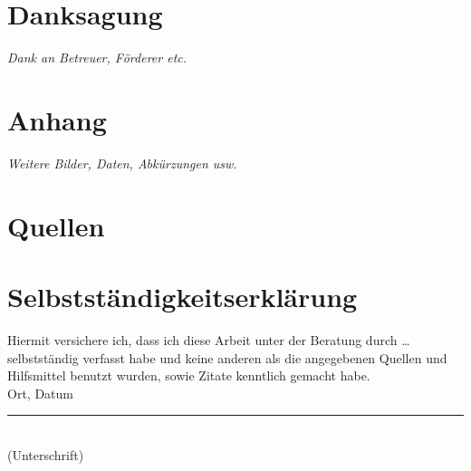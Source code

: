 \section*{Danksagung}

\textit{Dank an Betreuer, Förderer etc.}

\section{Anhang}

\textit{Weitere Bilder, Daten, Abkürzungen usw.}

\section*{Quellen}
\bib
\appendix

\newpage
\section*{Selbstständigkeitserklärung}
Hiermit versichere ich, dass ich diese Arbeit unter der Beratung durch … selbstständig verfasst habe und keine anderen als die angegebenen Quellen und Hilfsmittel benutzt wurden, sowie Zitate kenntlich gemacht habe. \\[2cm]

Ort, Datum \hfill \rule{5cm}{0.4pt} \\
\hfill (Unterschrift)
	
